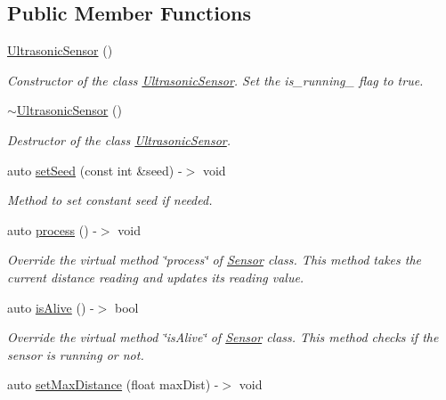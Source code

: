 \subsection*{Public Member Functions}
\begin{DoxyCompactItemize}
\item 
\hyperlink{class_ultrasonic_sensor_afc21cb39ba75dfd008e1e82c82d2e61f}{Ultrasonic\+Sensor} ()
\begin{DoxyCompactList}\small\item\em Constructor of the class \hyperlink{class_ultrasonic_sensor}{Ultrasonic\+Sensor}. Set the is\+\_\+running\+\_\+ flag to true. \end{DoxyCompactList}\item 
\hyperlink{class_ultrasonic_sensor_aec2722048b7070bd2b0f665b210f0d1a}{$\sim$\+Ultrasonic\+Sensor} ()
\begin{DoxyCompactList}\small\item\em Destructor of the class \hyperlink{class_ultrasonic_sensor}{Ultrasonic\+Sensor}. \end{DoxyCompactList}\item 
auto \hyperlink{class_ultrasonic_sensor_abb877ee0a45cc3a1856a13536c95f474}{set\+Seed} (const int \&seed) -\/$>$ void
\begin{DoxyCompactList}\small\item\em Method to set constant seed if needed. \end{DoxyCompactList}\item 
auto \hyperlink{class_ultrasonic_sensor_af20b33a57f5b4522566d6856f6ca4428}{process} () -\/$>$ void
\begin{DoxyCompactList}\small\item\em Override the virtual method \char`\"{}process\char`\"{} of \hyperlink{class_sensor}{Sensor} class. This method takes the current distance reading and updates its reading value. \end{DoxyCompactList}\item 
auto \hyperlink{class_ultrasonic_sensor_af10dfe88aa79e9c108055d5b4b5144e9}{is\+Alive} () -\/$>$ bool
\begin{DoxyCompactList}\small\item\em Override the virtual method \char`\"{}is\+Alive\char`\"{} of \hyperlink{class_sensor}{Sensor} class. This method checks if the sensor is running or not. \end{DoxyCompactList}\item 
auto \hyperlink{class_ultrasonic_sensor_a831b3ae96fb0537d8a7e7c12e8214f66}{set\+Max\+Distance} (float max\+Dist) -\/$>$ void

\end{DoxyCompactItemize}
